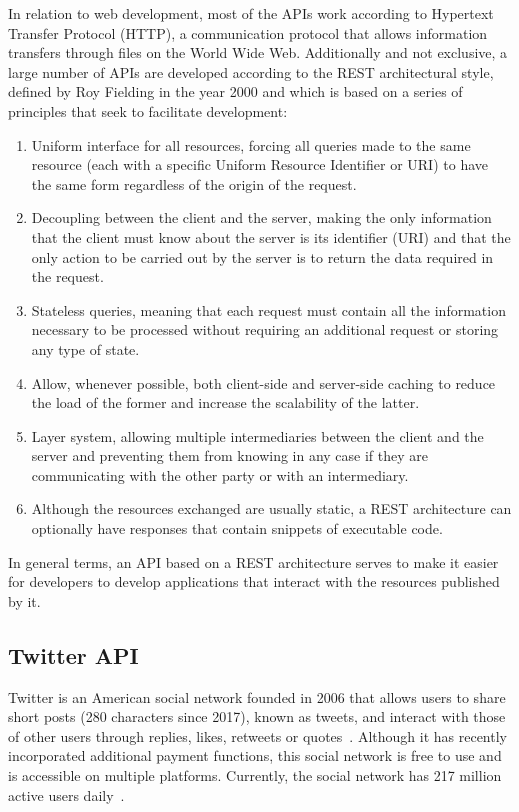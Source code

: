 \nonzeroparskip In relation to web development, most of the APIs work according to Hypertext Transfer Protocol (HTTP), a communication protocol that allows information transfers through files on the World Wide Web. Additionally and not exclusive, a large number of APIs are developed according to the REST architectural style, defined by Roy Fielding in the year 2000 and which is based on a series of principles that seek to facilitate development:
\begin{enumerate}
	\item Uniform interface for all resources, forcing all queries made to the same resource (each with a specific Uniform Resource Identifier or URI) to have the same form regardless of the origin of the request.
	\item Decoupling between the client and the server, making the only information that the client must know about the server is its identifier (URI) and that the only action to be carried out by the server is to return the data required in the request.
	\item Stateless queries, meaning that each request must contain all the information necessary to be processed without requiring an additional request or storing any type of state.
	\item Allow, whenever possible, both client-side and server-side caching to reduce the load of the former and increase the scalability of the latter.
	\item Layer system, allowing multiple intermediaries between the client and the server and preventing them from knowing in any case if they are communicating with the other party or with an intermediary.
	\item Although the resources exchanged are usually static, a REST architecture can optionally have responses that contain snippets of executable code.
\end{enumerate}

\nonzeroparskip In general terms, an API based on a REST architecture serves to make it easier for developers to develop applications that interact with the resources published by it.

\subsection{Twitter API}
\nonzeroparskip Twitter is an American social network founded in 2006 that allows users to share short posts (280 characters since 2017), known as tweets, and interact with those of other users through replies, likes, retweets or quotes~\cite{wikipedia_twitter}. Although it has recently incorporated additional payment functions, this social network is free to use and is accessible on multiple platforms. Currently, the social network has 217 million active users daily~\cite{variety_twitterusers}.

